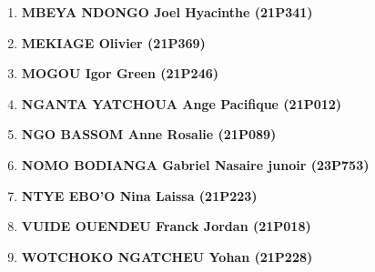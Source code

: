 \begin{enumerate}
    \item \textbf{MBEYA NDONGO Joel Hyacinthe (21P341) } \\[0.01cm]
    \item \textbf{MEKIAGE Olivier (21P369)} \\[0.05cm]
    \item \textbf{MOGOU Igor Green (21P246) } \\[0.05cm]
    \item \textbf{NGANTA YATCHOUA Ange Pacifique (21P012) }\\[0.05cm]
    \item \textbf{NGO BASSOM Anne Rosalie (21P089) } \\[0.05cm]
    \item \textbf{NOMO BODIANGA Gabriel Nasaire junoir (23P753)  } \\[0.05cm]
    \item \textbf{NTYE EBO'O Nina Laissa (21P223) } \\[0.05cm]
    \item \textbf{VUIDE OUENDEU Franck Jordan (21P018)} \\[0.05cm]
    \item \textbf{WOTCHOKO NGATCHEU Yohan (21P228) } \\[0.05cm]
\end{enumerate}